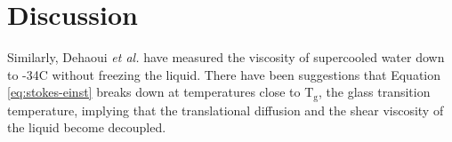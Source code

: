 \section{Discussion}
Similarly, Dehaoui
\textit{et al.} have measured the viscosity of supercooled water down
to -34\degree C without freezing the liquid.\cite{Dehaoui2015} There
have been suggestions that Equation \eqref{eq:stokes-einst} breaks
down at temperatures close to T$_\mathrm{g}$, the glass transition
temperature, implying that the translational diffusion and the shear
viscosity of the liquid become decoupled.







